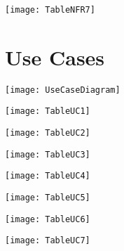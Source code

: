 \begin{center}

\centering
\texttt{[image: TableNFR7]}
\end{center}


\section{Use Cases}

\begin{center}
\centering
\texttt{[image: UseCaseDiagram]}
\label{fig:UseCaseDiagram}
\end{center}

\begin{center}
\centering
\texttt{[image: TableUC1]}
\end{center}
\begin{center}

\centering
\texttt{[image: TableUC2]}
\end{center}

\begin{center}

\centering
\texttt{[image: TableUC3]}
\end{center}

\begin{center}

\centering
\texttt{[image: TableUC4]}
\end{center}

\begin{center}

\centering
\texttt{[image: TableUC5]}
\end{center}

\begin{center}

\centering
\texttt{[image: TableUC6]}
\end{center}

\begin{center}

\centering
\texttt{[image: TableUC7]}
\end{center}

